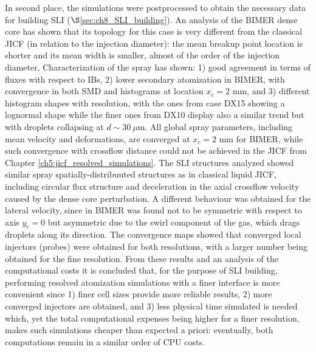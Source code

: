In second place, the simulations were postprocessed to obtain the necessary data for building SLI ($\S$\ref{sec:ch8_SLI_building}). An analysis of the BIMER dense core has shown that its topology for this case is very different from the classical JICF (in relation to the injection diameter): the mean breakup point location is shorter and its mean width is smaller, almost of the order of the injection diameter. Characterization of the spray has shown: 1) good agreement in terms of fluxes with respect to IBs, 2) lower secondary atomization in BIMER, with convergence in both SMD and histograms at location $x_c = 2$ mm, and 3) different histogram shapes with resolution, with the ones from case DX15 showing a lognormal shape while the finer ones from DX10 display also a similar trend but with droplets collapsing at $d \sim 30~\mu$m. All global spray parameters, including mean velocity and deformations, are converged at $x_c = 2$ mm for BIMER, while such convergence with crossflow distance could not be achieved in the JICF from Chapter \ref{ch5:jicf_resolved_simulations}. The SLI structures analyzed showed similar spray spatially-distribuuted structures as in classical liquid JICF, including circular flux structure and deceleration in the axial crossflow velocity caused by the dense core perturbation. A different behaviour was obtained for the lateral velocity, since in BIMER was found not to be symmetric with respect to axis $y_c = 0$ but asymmetric due to the swirl component of the gas, which drags droplets along its direction. The convergence maps showed that converged local injectors (probes) were obtained for both resolutions, with a larger number being obtained for the fine resolution. From these results and an analysis of the computational costs it is concluded that, for the purpose of SLI building, performing resolved atomization simulations with a finer interface is more convenient since 1) finer cell sizes provide more reliable results, 2) more converged injectors are obtained, and 3) less physical time simulated is needed which, yet the total computational expenses being higher for a finer resolution, makes such simulations cheaper than expected a priori: eventually, both computations remain in a similar order of CPU costs.

